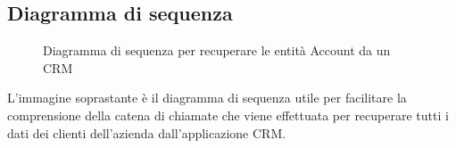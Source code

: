 \subsection{Diagramma di sequenza}
	\begin{figure}[H]
	\centering
	
	\caption{Diagramma di sequenza per recuperare le entità Account da un \gls{CRM} }
	\label{fig:sdProposals}
\end{figure}

L'immagine soprastante è il diagramma di sequenza utile per facilitare la comprensione della catena di chiamate che viene effettuata per recuperare tutti i dati dei clienti dell'azienda dall'applicazione \gls{CRM}.

